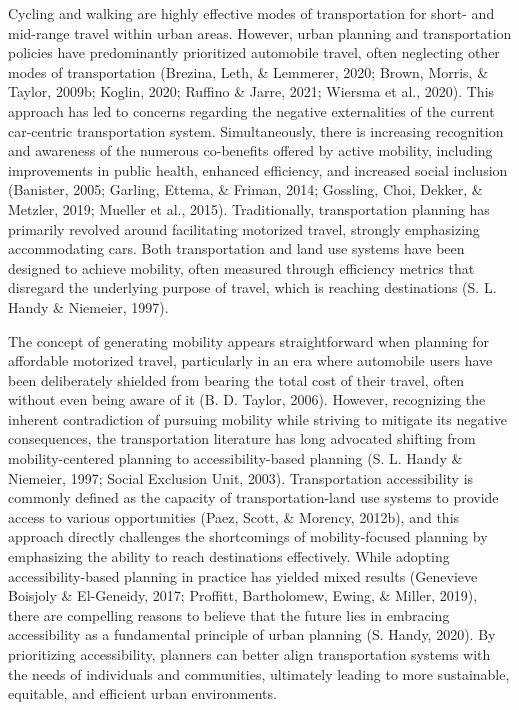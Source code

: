 \documentclass[12pt,twoside]{reedthesis}
\begin{document}
Cycling and walking are highly effective modes of transportation for short- and mid-range travel within urban areas. However, urban planning and transportation policies have predominantly prioritized automobile travel, often neglecting other modes of transportation (Brezina, Leth, \& Lemmerer, 2020; Brown, Morris, \& Taylor, 2009b; Koglin, 2020; Ruffino \& Jarre, 2021; Wiersma et al., 2020). This approach has led to concerns regarding the negative externalities of the current car-centric transportation system. Simultaneously, there is increasing recognition and awareness of the numerous co-benefits offered by active mobility, including improvements in public health, enhanced efficiency, and increased social inclusion (Banister, 2005; Garling, Ettema, \& Friman, 2014; Gossling, Choi, Dekker, \& Metzler, 2019; Mueller et al., 2015). Traditionally, transportation planning has primarily revolved around facilitating motorized travel, strongly emphasizing accommodating cars. Both transportation and land use systems have been designed to achieve mobility, often measured through efficiency metrics that disregard the underlying purpose of travel, which is reaching destinations (S. L. Handy \& Niemeier, 1997).

The concept of generating mobility appears straightforward when planning for affordable motorized travel, particularly in an era where automobile users have been deliberately shielded from bearing the total cost of their travel, often without even being aware of it (B. D. Taylor, 2006). However, recognizing the inherent contradiction of pursuing mobility while striving to mitigate its negative consequences, the transportation literature has long advocated shifting from mobility-centered planning to accessibility-based planning (S. L. Handy \& Niemeier, 1997; Social Exclusion Unit, 2003). Transportation accessibility is commonly defined as the capacity of transportation-land use systems to provide access to various opportunities (Paez, Scott, \& Morency, 2012b), and this approach directly challenges the shortcomings of mobility-focused planning by emphasizing the ability to reach destinations effectively. While adopting accessibility-based planning in practice has yielded mixed results (Genevieve Boisjoly \& El-Geneidy, 2017; Proffitt, Bartholomew, Ewing, \& Miller, 2019), there are compelling reasons to believe that the future lies in embracing accessibility as a fundamental principle of urban planning (S. Handy, 2020). By prioritizing accessibility, planners can better align transportation systems with the needs of individuals and communities, ultimately leading to more sustainable, equitable, and efficient urban environments.
\end{document}
